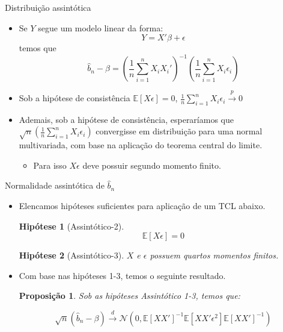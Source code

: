 \documentclass[11pt]{beamer}
\newtheorem{proposition}{Proposição}
\newtheorem{assumption}{Hipótese}
\begin{document}
	\begin{frame}{Distribuição assintótica}
	\begin{itemize}
		\item Se $Y$ segue um modelo linear da forma:
		$$Y = X'\beta + \epsilon$$
		\vspace{-0.5em}
		temos que
		\vspace{-0.5em}
		$$\hat{b}_n - \beta = \left(\frac{1}{n}\sum_{i=1}^n X_i X_i'\right)^{-1}\left(\frac{1}{n}\sum_{i=1}^nX_i \epsilon_i\right)$$
		\item Sob a hipótese de consistência $\mathbb{E}[X\epsilon] = 0$, $\frac{1}{n}\sum_{i=1}^nX_i \epsilon_i \overset{p}{\to} 0 $
			\item Ademais, sob a hipótese de consistência, esperaríamos que  $\sqrt{n}\left(\frac{1}{n}\sum_{i=1}^nX_i \epsilon_i \right)$ convergisse {\color{blue}em distribuição} para uma normal multivariada, com base na aplicação do teorema central do limite.
			\begin{itemize}
				\item Para isso $X\epsilon$ deve possuir segundo momento finito.
			\end{itemize}
	\end{itemize}
	\end{frame}
	\begin{frame}{Normalidade assintótica de $\hat{b}_n$}
	\begin{itemize}
\item Elencamos hipóteses suficientes para aplicação de um TCL abaixo.
	\begin{assumption}[Assintótico-2]
		$$\mathbb{E}[X\epsilon]= 0$$
	\end{assumption}
	\begin{assumption}[Assintótico-3]
		$X$ e $\epsilon$ possuem quartos momentos finitos.
\end{assumption}
\item Com base nas hipóteses 1-3, temos o seguinte resultado.
\begin{proposition}
	Sob as hipóteses Assintótico 1-3, temos que:
	
	$$\sqrt{n}(\hat{b}_n - \beta) \overset{d}{\to}\mathcal{N}(0, \mathbb{E}[XX']^{-1}\mathbb{E}[XX'\epsilon^2]\mathbb{E}[XX']^{-1})$$
\end{proposition}
\end{itemize}
	\end{frame}
	
\end{document}
